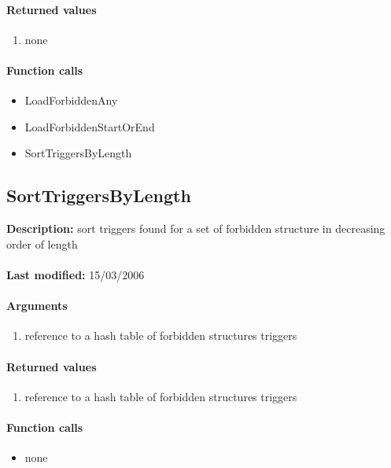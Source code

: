 \paragraph{Returned values}
\begin{enumerate}
\item none
\end{enumerate}

\paragraph{Function calls}
\begin{itemize}
\item LoadForbiddenAny
\item LoadForbiddenStartOrEnd
\item SortTriggersByLength
\end{itemize}

\subsection{SortTriggersByLength}
\textbf{Description:} sort triggers found for a set of forbidden structure in decreasing order of length\\
\\\textbf{Last modified:} 15/03/2006

\paragraph{Arguments}
\begin{enumerate}
\item reference to a hash table of forbidden structures triggers
\end{enumerate}

\paragraph{Returned values}
\begin{enumerate}
\item reference to a hash table of forbidden structures triggers
\end{enumerate}

\paragraph{Function calls}
\begin{itemize}
\item none
\end{itemize}

